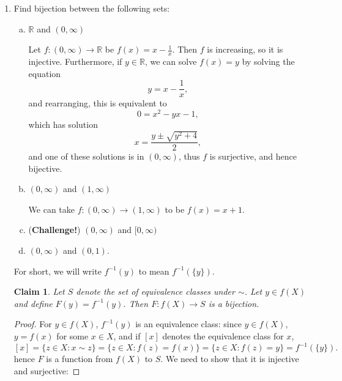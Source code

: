 \documentclass[a4paper,12pt,dvipsnames]{book}
\newtheorem{claim}[theorem]{Claim}
\numberwithin{theorem}{chapter}
\theoremstyle{remark}
\def\R{\mathbb{R}}
\begin{document}
\begin{enumerate}
\begin{enumerate}[(a)]
\end{enumerate}

\item Find bijection between the following sets:

\begin{enumerate}[(a)]
\item $\R$ and $(0,\infty)$

\begin{solution}
Let $f:(0,\infty) \rightarrow \R $ be $f(x)=x-\frac{1}{x}$. Then $f$ is increasing, so it is injective. Furthermore, if $y\in \R$, we can solve $f(x)=y$ by solving the equation
\[
y= x-\frac{1}{x},
\]
and rearranging, this is equivalent to 
\[
0=x^2-yx-1,\]
which has solution
\[
x=\frac{y\pm\sqrt{y^2+4}}{2},\]
and one of these solutions is in $(0,\infty)$, thus $f$ is surjective, and hence bijective. 
\end{solution}

\item $(0,\infty)$ and $(1,\infty)$

\begin{solution}
We can take $f:(0,\infty)\rightarrow (1,\infty)$ to be $f(x)=x+1$. 
\end{solution}

\item ({\bf Challenge!}) $(0,\infty)$ and $[0,\infty)$

\item $(0,\infty)$ and $(0,1)$.
\end{enumerate}



\begin{solution}

For short, we will write $f^{-1}(y)$ to mean $f^{-1}(\{y\})$. 
\begin{claim}
Let $S$ denote the set of equivalence classes under $\sim$. Let $y\in f(X)$ and define  $F(y)=f^{-1}(y)$. Then $F:f(X)\rightarrow S$ is a bijection. 
\end{claim}

\begin{proof}
For $y\in f(X)$, $f^{-1}(y)$ is an equivalence class: since $y\in f(X)$, $y=f(x)$ for some $x\in X$, and if $[x]$ denotes the equivalence class for $x$,
\[
[x]=\{z\in X:x\sim z\} = \{z\in X:f(z)=f(x)\}
= \{z\in X:f(z)=y\}
 =f^{-1}(\{y\}).
 \]
hence $F$ is a function from $f(X)$ to $S$. We need to show that it is injective and surjective:


\end{proof}
\end{solution}
\end{enumerate}
\end{document}
